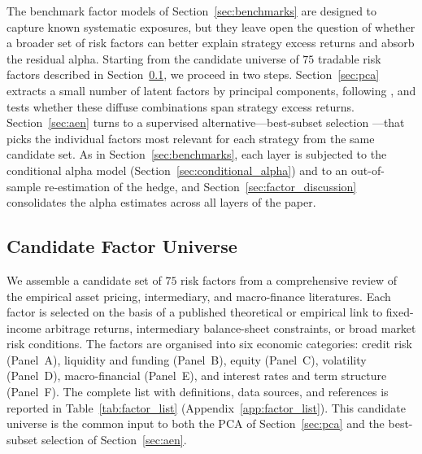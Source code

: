 


The benchmark factor models of Section~\ref{sec:benchmarks} are
designed to capture known systematic exposures, but they leave open
the question of whether a broader set of risk factors can better
explain strategy excess returns and absorb the residual alpha.
Starting from the candidate universe of $75$ tradable risk factors
described in Section~\ref{sec:factor_universe}, we proceed in two
steps. Section~\ref{sec:pca} extracts a small number of latent factors
by principal components, following \citet{connor1986performance,
connor1988risk}, and tests whether these diffuse combinations span
strategy excess returns. Section~\ref{sec:aen} turns to a supervised
alternative---best-subset selection \citep{bertsimas2016best}---that
picks the individual factors most relevant for each strategy from the
same candidate set. As in Section~\ref{sec:benchmarks}, each layer is
subjected to the conditional alpha model
(Section~\ref{sec:conditional_alpha}) and to an out-of-sample
re-estimation of the hedge, and
Section~\ref{sec:factor_discussion} consolidates the alpha estimates
across all layers of the paper.



\subsection{Candidate Factor Universe}
\label{sec:factor_universe}

We assemble a candidate set of $75$ risk factors from a comprehensive
review of the empirical asset pricing, intermediary, and macro-finance
literatures. Each factor is selected on the basis of a published
theoretical or empirical link to fixed-income arbitrage returns,
intermediary balance-sheet constraints, or broad market risk
conditions. The factors are organised into six economic categories:
credit risk (Panel~A), liquidity and funding (Panel~B), equity
(Panel~C), volatility (Panel~D), macro-financial (Panel~E), and
interest rates and term structure (Panel~F). The complete list with
definitions, data sources, and references is reported in
Table~\ref{tab:factor_list} (Appendix~\ref{app:factor_list}). This
candidate universe is the common input to both the PCA of
Section~\ref{sec:pca} and the best-subset selection of
Section~\ref{sec:aen}.

